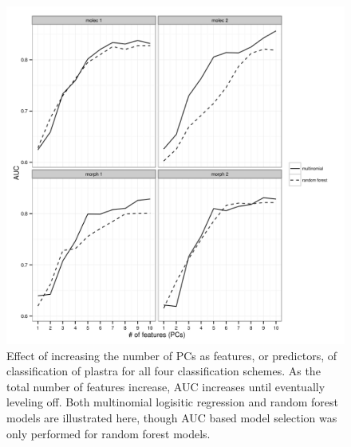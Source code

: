 \documentclass[12pt,letterpaper]{article}\usepackage{graphicx, color}
\begin{document}
\begin{figure}[ht]
  \centering
  \includegraphics[width = \textwidth]{figure/roc_sel}
  \caption{Effect of increasing the number of PCs as features, or predictors, of classification of plastra for all four classification schemes. As the total number of features increase, AUC increases until eventually leveling off. Both multinomial logisitic regression and random forest models are illustrated here, though AUC based model selection was only performed for random forest models.}
  \label{fig:roc}
\end{figure}
\end{document}
